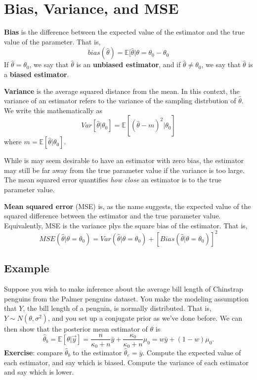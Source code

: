 \documentclass[titlepage, 12pt, leqno]{article}
\begin{document}
\pagebreak
\section{Bias, Variance, and MSE}

\begin{definition}
    \textbf{Bias} is the difference between the expected value of the estimator
    and the true value of the parameter. That is,
    \[
    bias(\hat \theta) = \mathbb{E}[\hat \theta | \theta = \theta_{0} - 
    \theta_{0}
    \]
    If $\hat \theta = \theta_{0}$, we say that $\hat \theta$ is an
    \textbf{unbiased estimator}, and if $\hat \theta \ne \theta_{0}$, we say
    that $\hat \theta$ is a \textbf{biased estimator}.
\end{definition}

\begin{definition}
    \textbf{Variance} is the average squared distance from the mean. In this
    context, the variance of an estimator refers to the variance of the
    sampling distrbution of $\hat \theta$. We write this mathematically as
    \[
        Var[\hat \theta | \theta_{0}] = \mathbb{E}[(\hat \theta - m)^{2}|
        \theta_{0}]
    \]
    where $m = \mathbb{E}[\hat \theta|\theta_{0}]$.
\end{definition}

While is may seem desirable to have an estimator with zero bias, the estimator
may still be far away from the true parameter value if the variance is too
large. The mean squared error quantifies \textit{how close} an estimator is to
the true parameter value.

\begin{definition}
    \textbf{Mean squared error} (MSE) is, as the name suggests, the expected
    value of the squared difference between the estimator and the true 
    parameter value. Equivalently, MSE is the variance plys the square bias
    of the estimator. That is,
    \[
    MSE(\hat \theta|\theta = \theta_{0}) = Var(\hat \theta|\theta =\theta_{0})
    + [Bias(\hat \theta|\theta = \theta_{0})]^{2}
    \]
\end{definition}

\subsection{Example}
Suppose you wish to make inference about the average bill length of Chinstrap
penguins from the Palmer penguins dataset. You make the modeling assumption 
that $Y$, the bill length of a penguin, is normally distributed. That is,
$Y \sim  N(\theta,\sigma^{2})$, and you set up a conjugate prior as we've done
before. We can then show that the posterior mean estimator of $\theta$ is
\[
    \hat \theta_{b} = \mathbb{E}[\theta|\vec y] = \frac{n}{\kappa_{0}+n}
    \bar y + \frac{\kappa_{0}}{\kappa_{0}+n}\mu_{0} = w\bar y + (1-w)\mu_{0}.
\]
\textbf{Exercise}: compare $\hat \theta_{b}$ to the estimator $\hat \theta_{e}
= \bar y$. Compute the expected value of each estimator, and say which is
biased. Compute the variance of each estimator and say which is lower.
\end{document}
